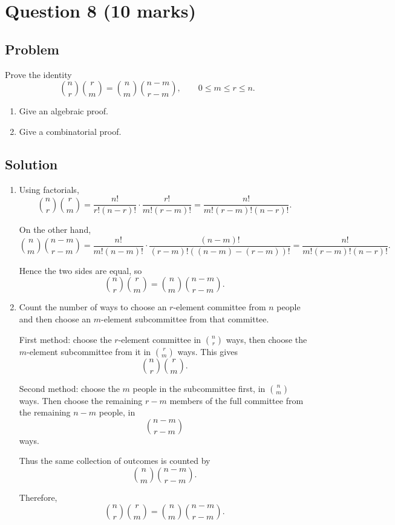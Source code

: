 \documentclass[12pt]{article}
\begin{document}
\newpage
\section{Question 8 \hfill (10 marks)}
\subsection{Problem}

Prove the identity
\[
\binom{n}{r}\binom{r}{m}=\binom{n}{m}\binom{n-m}{r-m},
\qquad 0\le m\le r\le n.
\]

\begin{enumerate}[label=(\alph*)]
    \item Give an algebraic proof.
    \item Give a combinatorial proof.
\end{enumerate}

\subsection{Solution}

\begin{enumerate}[label=(\alph*)]
    \item Using factorials,
    \[
    \binom{n}{r}\binom{r}{m}
    =\frac{n!}{r!(n-r)!}\cdot \frac{r!}{m!(r-m)!}
    =\frac{n!}{m!(r-m)!(n-r)!}.
    \]

    On the other hand,
    \[
    \binom{n}{m}\binom{n-m}{r-m}
    =\frac{n!}{m!(n-m)!}\cdot\frac{(n-m)!}{(r-m)!((n-m)-(r-m))!}
    =\frac{n!}{m!(r-m)!(n-r)!}.
    \]

    Hence the two sides are equal, so
    \[
    \boxed{\binom{n}{r}\binom{r}{m}=\binom{n}{m}\binom{n-m}{r-m}}.
    \]

    \item Count the number of ways to choose an $r$-element committee from $n$ people and then choose an $m$-element subcommittee from that committee.

    First method: choose the $r$-element committee in $\binom{n}{r}$ ways, then choose the $m$-element subcommittee from it in $\binom{r}{m}$ ways. This gives
    \[
    \binom{n}{r}\binom{r}{m}.
    \]

    Second method: choose the $m$ people in the subcommittee first, in $\binom{n}{m}$ ways. Then choose the remaining $r-m$ members of the full committee from the remaining $n-m$ people, in
    \[
    \binom{n-m}{r-m}
    \]
    ways.

    Thus the same collection of outcomes is counted by
    \[
    \binom{n}{m}\binom{n-m}{r-m}.
    \]

    Therefore,
    \[
    \boxed{\binom{n}{r}\binom{r}{m}=\binom{n}{m}\binom{n-m}{r-m}}.
    \]
\end{enumerate}
\end{document}
